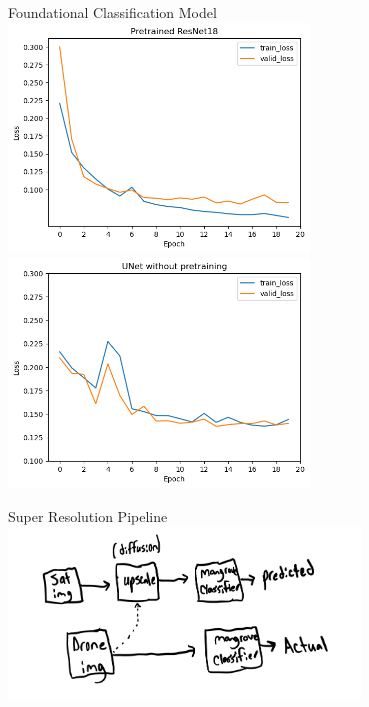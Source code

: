 \begin{frame}{Foundational Classification Model}
    \centering
    \includegraphics[height=0.6\textheight,width=0.6\textwidth,keepaspectratio]{images/pretrained.png}
    \includegraphics[height=0.6\textheight,width=0.6\textwidth,keepaspectratio]{images/untrained.png}
\end{frame}

\begin{frame}{Super Resolution Pipeline}
    \centering
    \includegraphics[height=0.7\textheight,width=0.7\textwidth,keepaspectratio]{images/superres.jpeg}
\end{frame}



